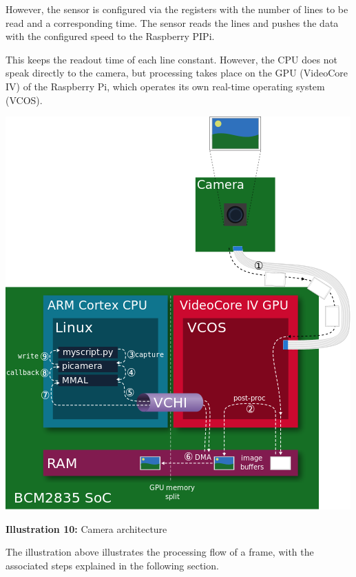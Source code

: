 \documentclass[12pt, a4paper]{report}
\begin{document}
However, the sensor is configured via the registers with the number of lines to be read and a corresponding time. The sensor reads the lines and pushes the data with the configured speed to the Raspberry PIPi.

This keeps the readout time of each line constant. However, the CPU does not speak directly to the camera, but processing takes place on the GPU (VideoCore IV) of the Raspberry Pi, which operates its own real-time operating system (VCOS).

\bigskip

\noindent
\begin{center}
\includegraphics[scale=0.6]{Images/camera_architecture.png}

{\bf Illustration 10:}  Camera architecture
\end{center}

\bigskip

The illustration above illustrates the processing flow of a frame, with the associated steps explained in the following section.
\end{document}
